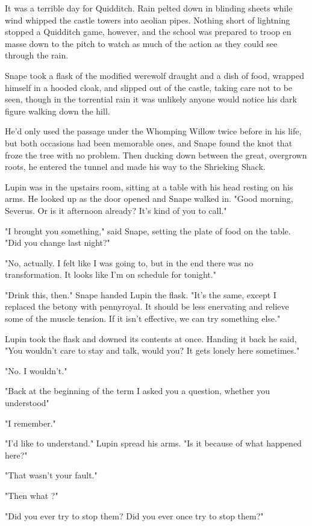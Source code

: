 It was a terrible day for Quidditch. Rain pelted down in blinding sheets while wind whipped the castle towers into aeolian pipes. Nothing short of lightning stopped a Quidditch game, however, and the school was prepared to troop en masse down to the pitch to watch as much of the action as they could see through the rain.

Snape took a flask of the modified werewolf draught and a dish of food, wrapped himself in a hooded cloak, and slipped out of the castle, taking care not to be seen, though in the torrential rain it was unlikely anyone would notice his dark figure walking down the hill.

He'd only used the passage under the Whomping Willow twice before in his life, but both occasions had been memorable ones, and Snape found the knot that froze the tree with no problem. Then ducking down between the great, overgrown roots, he entered the tunnel and made his way to the Shrieking Shack.

Lupin was in the upstairs room, sitting at a table with his head resting on his arms. He looked up as the door opened and Snape walked in. "Good morning, Severus. Or is it afternoon already? It's kind of you to call."

"I brought you something," said Snape, setting the plate of food on the table. "Did you change last night?"

"No, actually. I felt like I was going to, but in the end there was no transformation. It looks like I'm on schedule for tonight."

"Drink this, then." Snape handed Lupin the flask. "It's the same, except I replaced the betony with pennyroyal. It should be less enervating and relieve some of the muscle tension. If it isn't effective, we can try something else."

Lupin took the flask and downed its contents at once. Handing it back he said, "You wouldn't care to stay and talk, would you? It gets lonely here sometimes."

"No. I wouldn't."

"Back at the beginning of the term I asked you a question, whether you understood{\el}"

"I remember."

"I'd like to understand." Lupin spread his arms. "Is it because of what happened here?"

"That wasn't your fault."

"Then what{\el} ?"

"Did you ever try to stop them? Did you ever once try to stop them?"

